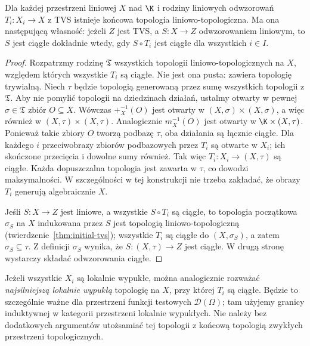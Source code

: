 \begin{twierdzenie}
\label{thm:final-tvs}
Dla każdej przestrzeni liniowej $X$ nad $\K$ i rodziny
liniowych odwzorowań $T_i:X_i\to X$ z TVS istnieje
końcowa topologia liniowo-topologiczna. Ma ona następującą
własność: jeżeli $Z$ jest TVS, a $S:X\to Z$ odwzorowaniem
liniowym, to $S$ jest ciągłe dokładnie wtedy, gdy
$S\circ T_i$ jest ciągłe dla wszystkich $i\in I$.
\end{twierdzenie}
\begin{proof}
Rozpatrzmy rodzinę $\mathfrak T$ wszystkich topologii
liniowo-topologicznych na $X$, względem których wszystkie
$T_i$ są ciągłe. Nie jest ona pusta: zawiera topologię
trywialną. Niech $\tau$ będzie topologią generowaną
przez sumę wszystkich topologii z $\mathfrak T$.
Aby nie pomylić topologii na dziedzinach działań,
ustalmy otwarty w pewnej $\sigma\in\mathfrak T$ zbiór
$O\subseteq X$. Wówczas
$+_X^{-1}(O)$ jest otwarty w $(X,\sigma)\times(X,\sigma)$,
a więc również w $(X,\tau)\times(X,\tau)$.
Analogicznie $m_X^{-1}(O)$ jest otwarty w
$\K\times(X,\tau)$. Ponieważ takie zbiory $O$
tworzą podbazę $\tau$, oba działania są łącznie ciągłe.
Dla każdego $i$ przeciwobrazy zbiorów podbazowych przez
$T_i$ są otwarte w $X_i$; ich skończone przecięcia
i dowolne sumy również. Tak więc $T_i:X_i\to(X,\tau)$
są ciągłe. Każda dopuszczalna topologia jest zawarta
w $\tau$, co dowodzi maksymalności. W szczególności
w tej konstrukcji nie trzeba zakładać, że obrazy $T_i$
generują algebraicznie $X$.

Jeśli $S:X\to Z$ jest liniowe, a wszystkie $S\circ T_i$
są ciągłe, to topologia początkowa $\sigma_S$ na $X$
indukowana przez $S$ jest topologią liniowo-topologiczną
(twierdzenie~\ref{thm:initial-tvs}); wszystkie $T_i$
są ciągłe do $(X,\sigma_S)$, a zatem $\sigma_S\subseteq\tau$.
Z definicji $\sigma_S$ wynika, że $S:(X,\tau)\to Z$
jest ciągłe. W drugą stronę wystarczy składać odwzorowania
ciągłe.
\end{proof}

\begin{uwaga}
Jeżeli wszystkie $X_i$ są lokalnie wypukłe, można
analogicznie rozważać \emph{najsilniejszą lokalnie wypukłą}
topologię na $X$, przy której $T_i$ są ciągłe.
Będzie to szczególnie ważne dla przestrzeni funkcji
testowych $\mathcal D(\Omega)$; tam użyjemy granicy
induktywnej w kategorii przestrzeni lokalnie wypukłych.
Nie należy bez dodatkowych argumentów utożsamiać
tej topologii z końcową topologią zwykłych przestrzeni
topologicznych.
\end{uwaga}


